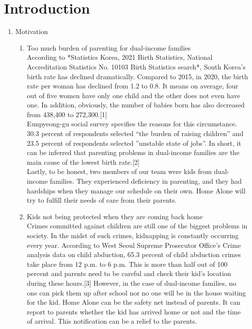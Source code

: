 \documentclass[conference]{IEEEtran}
\begin{document}
\section{\Large{Introduction}}
\begin{enumerate}[label=\arabic*.]
    \item {\large{Motivation}} \\
    \begin{enumerate}[label=\alph*.]
        \item Too much burden of parenting for dual-income families\\
        According to *Statistics Korea, 2021 Birth Statistics, National Accreditation Statistics No. 10103 Birth Statistics search*, South Korea’s birth rate has declined dramatically. Compared to 2015, in 2020, the birth rate per woman has declined from 1.2 to 0.8. It means on average, four out of five women have only one child and the other does not even have one. In addition, obviously, the number of babies born has also decreased from 438,400 to 272,300.[1] \\
        Eunpyeong-gu social survey specifies the reasons for this circumstance. 30.3 percent of respondents selected “the burden of raising children” and 23.5 percent of respondents selected ”unstable state of jobs”. In short, it can be inferred that parenting problems in dual-income families are the main cause of the lowest birth rate.[2]\\
        Lastly, to be honest, two members of our team were kids from dual-income families. They experienced deficiency in parenting, and they had hardships when they manage our schedule on their own. Home Alone will try to fulfill their needs of care from their parents. \\
        \item Kids not being protected when they are coming back home\\
        Crimes committed against children are still one of the biggest problems in society. In the midst of such crimes, kidnapping is constantly occurring every year. According to West Seoul Supreme Prosecutor Office’s Crime analysis data on child abduction, 65.3 percent of child abduction crimes take place from 12 p.m. to 6 p.m. This is more than half out of 100 percent and parents need to be careful and check their kid’s location during these hours.[3] However, in the case of dual-income families, no one can pick them up after school nor no one will be in the house waiting for the kid. Home Alone can be the safety net instead of parents. It can report to parents whether the kid has arrived home or not and the time of arrival. This notification can be a relief to the parents. \\

\end{enumerate}
\end{enumerate}
\end{document}
